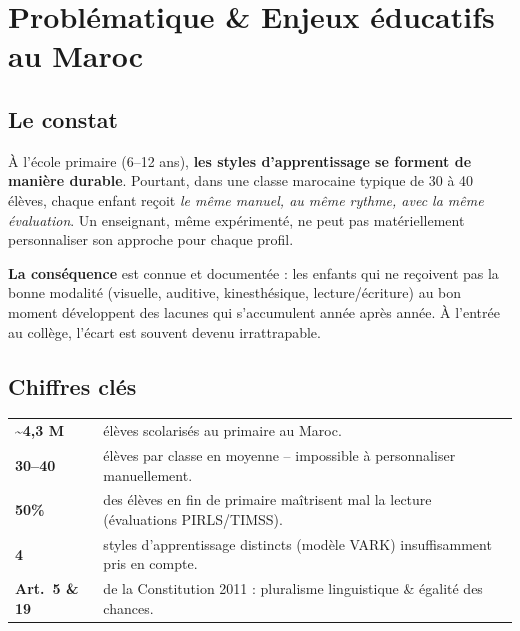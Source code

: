\documentclass[11pt,a4paper]{article}
\begin{document}
\newpage

\section{Problématique \& Enjeux éducatifs au Maroc}

\subsection{Le constat}

À l'école primaire (6--12 ans), \textbf{les styles d'apprentissage se forment de manière durable}.
Pourtant, dans une classe marocaine typique de 30 à 40 élèves, chaque enfant reçoit
\emph{le même manuel, au même rythme, avec la même évaluation}. Un enseignant, même
expérimenté, ne peut pas matériellement personnaliser son approche pour chaque profil.

\textbf{La conséquence} est connue et documentée : les enfants qui ne reçoivent pas la bonne
modalité (visuelle, auditive, kinesthésique, lecture/écriture) au bon moment développent
des lacunes qui s'accumulent année après année. À l'entrée au collège, l'écart est
souvent devenu irrattrapable.

\subsection{Chiffres clés}

\begin{tcolorbox}[colback=white, colframe=primary, boxrule=0.6pt, arc=1pt,
  left=8pt,right=8pt,top=6pt,bottom=6pt]
\small
\begin{tabular}{@{}p{4.7cm}p{10.3cm}@{}}
\textcolor{primary}{\textbf{\textasciitilde 4,3 M}} & élèves scolarisés au primaire au Maroc.\\[2pt]
\textcolor{primary}{\textbf{30--40}}                & élèves par classe en moyenne -- impossible à personnaliser manuellement.\\[2pt]
\textcolor{primary}{\textbf{50\%}}                  & des élèves en fin de primaire maîtrisent mal la lecture (évaluations PIRLS/TIMSS).\\[2pt]
\textcolor{primary}{\textbf{4}}                     & styles d'apprentissage distincts (modèle VARK) insuffisamment pris en compte.\\[2pt]
\textcolor{primary}{\textbf{Art.\ 5 \& 19}}         & de la Constitution 2011 : pluralisme linguistique \& égalité des chances.\\
\end{tabular}
\end{tcolorbox}
\end{document}
